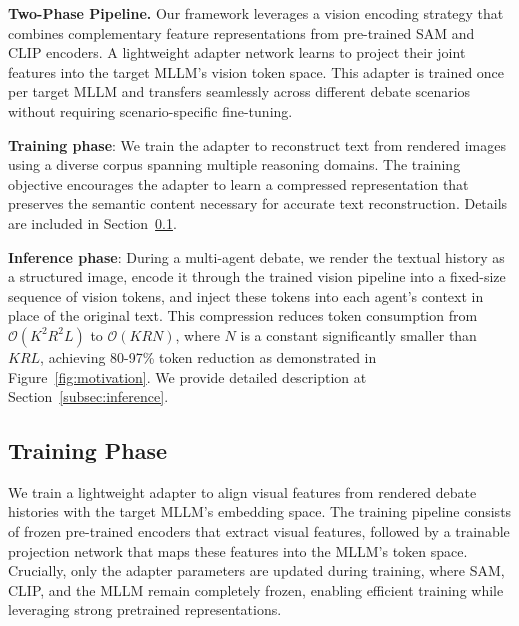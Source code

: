 \documentclass{article}
\theoremstyle{plain}
\theoremstyle{definition}
\theoremstyle{remark}
\begin{document}
\textbf{Two-Phase Pipeline.}
Our framework leverages a vision encoding strategy that combines 
complementary feature representations from pre-trained SAM and CLIP encoders. 
A lightweight adapter network learns to project their joint features into the 
target MLLM's vision token space. This adapter is trained once per target MLLM 
and transfers seamlessly across different debate scenarios without requiring 
scenario-specific fine-tuning.

\noindent\textbf{Training phase}: 
We train the adapter to reconstruct text from rendered images using a diverse 
corpus spanning multiple reasoning domains. The training objective encourages the 
adapter to learn a compressed representation that preserves the semantic content 
necessary for accurate text reconstruction. Details are included in Section~\ref{subsec:training_phase}.

\noindent\textbf{Inference phase}: 
During a multi-agent debate, we render the textual history as a structured image, 
encode it through the trained vision pipeline into a fixed-size sequence of vision 
tokens, and inject these tokens into each agent's context in place of the original 
text. This compression reduces token consumption from $\mathcal{O}(K^2 R^2 L)$ to 
$\mathcal{O}(K R N)$, where $N$ is a constant significantly smaller than $K R L$, 
achieving 80-97\% token reduction as demonstrated in Figure~\ref{fig:motivation}. We provide detailed description at Section~\ref{subsec:inference}. 



\subsection{Training Phase}
\label{subsec:training_phase}

We train a lightweight adapter to align visual features from rendered debate histories 
with the target MLLM's embedding space. The training pipeline consists of frozen 
pre-trained encoders that extract visual features, followed by a trainable projection 
network that maps these features into the MLLM's token space. Crucially, only the 
adapter parameters are updated during training, where SAM, CLIP, and the MLLM remain 
completely frozen, enabling efficient training while leveraging strong pretrained 
representations.

\end{document}
